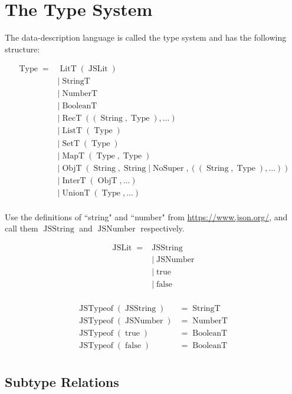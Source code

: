 \documentclass{article}
\DeclareMathOperator{\StringT}{StringT}
\DeclareMathOperator{\NumberT}{NumberT}
\DeclareMathOperator{\BooleanT}{BooleanT}
\DeclareMathOperator{\LitT}{LitT}
\DeclareMathOperator{\JSLit}{JSLit}
\DeclareMathOperator{\JSTypeof}{JSTypeof}
\DeclareMathOperator{\RecT}{RecT}
\DeclareMathOperator{\ObjT}{ObjT}
\DeclareMathOperator{\ListT}{ListT}
\DeclareMathOperator{\SetT}{SetT}
\DeclareMathOperator{\MapT}{MapT}
\DeclareMathOperator{\UnionT}{UnionT}
\DeclareMathOperator{\InterT}{InterT}
\DeclareMathOperator{\String}{String}
\DeclareMathOperator{\Type}{Type}
\DeclareMathOperator{\NoSuper}{NoSuper}
\begin{document}
\section{The Type System}

The data-description language is called the type system and has 
the following structure:

\begin{align*}
\Type = &\LitT(\JSLit) \\
&|\StringT \\
&|\NumberT \\
&|\BooleanT \\
&|\RecT((\String, \Type), ...) \\
&|\ListT(\Type) \\
&|\SetT(\Type) \\
&|\MapT(\Type, \Type) \\
&|\ObjT(\String, \String | \NoSuper, ((\String, \Type), ...)) \\
&|\InterT(\ObjT, ...) \\
&|\UnionT(\Type, ...)\\
\end{align*}

Use the definitions of ``string" and ``number" from
\href{https://www.json.org/}{https://www.json.org/}, 
and call them \(\operatorname{JSString}\) and 
\(\operatorname{JSNumber}\) respectively.

\begin{align*}
    \JSLit = &\operatorname{JSString} \\
    &| \operatorname{JSNumber} \\
    &| \operatorname{true} \\
    &| \operatorname{false} \\
\end{align*}

\begin{align*}
    \JSTypeof(\operatorname{JSString}) &= \StringT \\
    \JSTypeof(\operatorname{JSNumber}) &= \NumberT \\
    \JSTypeof(\operatorname{true}) &= \BooleanT \\
    \JSTypeof(\operatorname{false}) &= \BooleanT \\
\end{align*}

\subsection{Subtype Relations}
\end{document}
